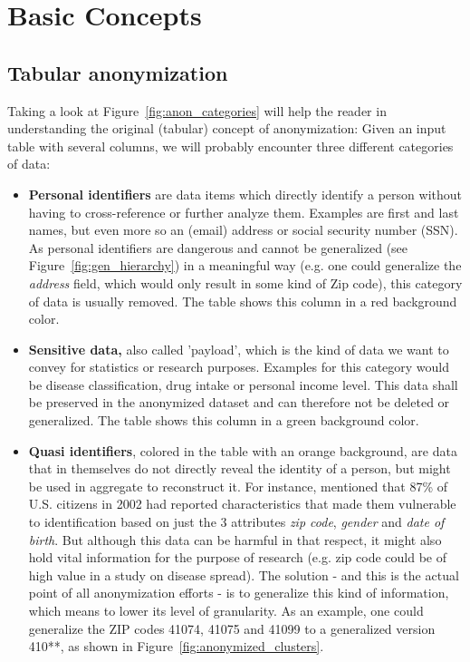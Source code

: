 \documentclass{llncs}
\begin{document}
\section{Basic Concepts}
\label{sect:basic_concepts}

\subsection{Tabular anonymization}
\label{ssect:tab_anonym}

Taking a look at Figure~\ref{fig:anon_categories} will help the reader in understanding the original (tabular) concept of anonymization: Given an input table with several columns, we will probably encounter three different categories of data:

\begin{itemize}
	\item \textbf{Personal identifiers} are data items which directly identify a person without having to cross-reference or further analyze them. Examples are first and last names, but even more so an (email) address or social security number (SSN). As personal identifiers are dangerous and cannot be generalized (see Figure~\ref{fig:gen_hierarchy}) in a meaningful way (e.g. one could generalize the \textit{address} field, which would only result in some kind of Zip code), this category of data is usually removed. The table shows this column in a red background color.
	\item \textbf{Sensitive data,} also called 'payload', which is the kind of data we want to convey for statistics or research purposes. Examples for this category would be disease classification, drug intake or personal income level. This data shall be preserved in the anonymized dataset and can therefore not be deleted or generalized. The table shows this column in a green background color.
	\item \textbf{Quasi identifiers}, colored in the table with an orange background, are data that in themselves do not directly reveal the identity of a person, but might be used in aggregate to reconstruct it. For instance, \cite{sweeney2002k} mentioned that 87\% of U.S. citizens in 2002 had reported characteristics that made them vulnerable to identification based on just the 3 attributes \textit{zip code}, \textit{gender} and \textit{date of birth}. But although this data can be harmful in that respect, it might also hold vital information for the purpose of research (e.g. zip code could be of high value in a study on disease spread). The solution - and this is the actual point of all anonymization efforts - is to generalize this kind of information, which means to lower its level of granularity. As an example, one could generalize the ZIP codes 41074, 41075 and 41099 to a generalized version 410**, as shown in Figure~\ref{fig:anonymized_clusters}.
\end{itemize}
\end{document}
